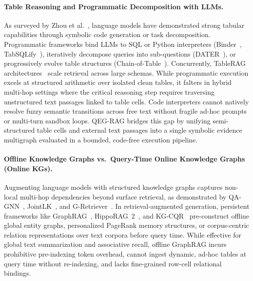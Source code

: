 \documentclass[runningheads]{llncs}
\begin{document}
\paragraph{Table Reasoning and Programmatic Decomposition with LLMs.}
As surveyed by Zhou et al.~\cite{zhou2026tableqasurvey}, language models have demonstrated strong tabular capabilities through symbolic code generation or task decomposition. Programmatic frameworks bind LLMs to SQL or Python interpreters (Binder~\cite{cheng2023binder}, TabSQLify~\cite{nahid2024tabsqlify}), iteratively decompose queries into sub-questions (DATER~\cite{ye2023dater}), or progressively evolve table structures (Chain-of-Table~\cite{wang2024chainoftable}). Concurrently, TableRAG architectures~\cite{chen2024tablerag,yu2025tablerag} scale retrieval across large schemas. While programmatic execution excels at structured arithmetic over isolated clean tables, it falters in hybrid multi-hop settings where the critical reasoning step requires traversing unstructured text passages linked to table cells. Code interpreters cannot natively resolve fuzzy semantic transitions across free text without fragile ad-hoc prompts or multi-turn sandbox loops. QEG-RAG bridges this gap by unifying semi-structured table cells and external text passages into a single symbolic evidence multigraph evaluated in a bounded, code-free execution pipeline.

\paragraph{Offline Knowledge Graphs vs.\ Query-Time Online Knowledge Graphs (Online KGs).}
Augmenting language models with structured knowledge graphs captures non-local multi-hop dependencies beyond surface retrieval, as demonstrated by QA-GNN~\cite{yasunaga2021qagnn}, JointLK~\cite{sun2022jointlk}, and G-Retriever~\cite{he2024gretriever}. In retrieval-augmented generation, persistent frameworks like GraphRAG~\cite{edge2024graphrag}, HippoRAG~2~\cite{gutierrez2025hipporag2}, and KG-CQR~\cite{bui2025kgcqr} pre-construct offline global entity graphs, personalized PageRank memory structures, or corpus-centric relation representations over text corpora before query time. While effective for global text summarization and associative recall, offline GraphRAG incurs prohibitive pre-indexing token overhead, cannot ingest dynamic, ad-hoc tables at query time without re-indexing, and lacks fine-grained row-cell relational bindings.
\end{document}
